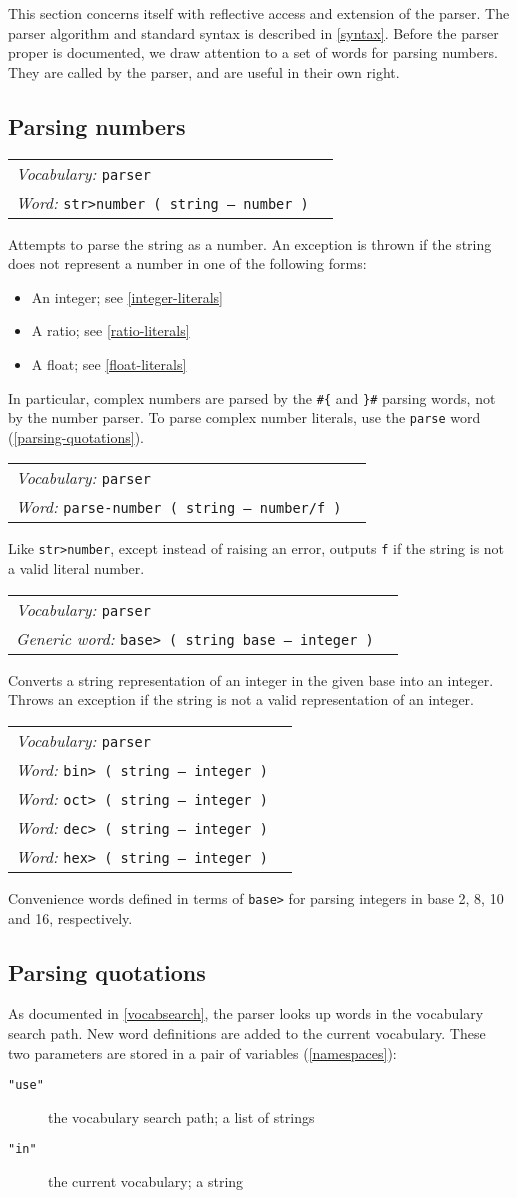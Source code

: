 \documentclass{book}
\newcommand{\vocabulary}[1]{\emph{Vocabulary:} \texttt{#1}&\\}
\newcommand{\ordinaryword}[2]{\index{\texttt{#1}}\emph{Word:} \texttt{#2}&\\}
\newcommand{\genericword}[2]{\index{\texttt{#1}}\emph{Generic word:} \texttt{#2}&\\}
\newcommand{\wordtable}[1]{


\begin{tabularx}{12cm}{lX}
\hline
#1
\hline
\end{tabularx}

}
\begin{document}
This section concerns itself with reflective access and extension of the parser. The parser algorithm and standard syntax is described in \ref{syntax}. Before the parser proper is documented, we draw attention to a set of words for parsing numbers. They are called by the parser, and are useful in their own right.

\subsection{\label{parsing-numbers}Parsing numbers}

\wordtable{
\vocabulary{parser}
\ordinaryword{str>number}{str>number~( string -- number )}
}
Attempts to parse the string as a number. An exception is thrown if the string does not represent a number in one of the following forms:
\begin{itemize}
\item An integer; see \ref{integer-literals}
\item A ratio; see \ref{ratio-literals}
\item A float; see \ref{float-literals}
\end{itemize}
In particular, complex numbers are parsed by the \verb|#{| and \verb|}#| parsing words, not by the number parser. To parse complex number literals, use the \texttt{parse} word (\ref{parsing-quotations}).
\wordtable{
\vocabulary{parser}
\ordinaryword{parse-number}{parse-number~( string -- number/f )}
}
Like \texttt{str>number}, except instead of raising an error, outputs \texttt{f} if the string is not a valid literal number.
\wordtable{
\vocabulary{parser}
\genericword{base>}{base>~( string base -- integer )}
}
Converts a string representation of an integer in the given base into an integer. Throws an exception if the string is not a valid representation of an integer.
\wordtable{
\vocabulary{parser}
\ordinaryword{bin>}{bin>~( string -- integer )}
\ordinaryword{oct>}{oct>~( string -- integer )}
\ordinaryword{dec>}{dec>~( string -- integer )}
\ordinaryword{hex>}{hex>~( string -- integer )}
}
Convenience words defined in terms of \texttt{base>} for parsing integers in base 2, 8, 10 and 16, respectively.

\subsection{\label{parsing-quotations}Parsing quotations}

As documented in \ref{vocabsearch}, the parser looks up words in the vocabulary search path. New word definitions are added to the current vocabulary. These two parameters are stored in a pair of variables (\ref{namespaces}):
\begin{description}
\item[\texttt{"use"}] the vocabulary search path; a list of strings
\item[\texttt{"in"}] the current vocabulary; a string
\end{description}
\end{document}
